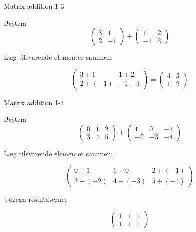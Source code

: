 \documentclass{article}
\begin{document}
\newpage

\begin{exercise}{Matrix addition 1-3}

Bestem
\[
\begin{pmatrix} 3 & 1 \\ 2 & -1 \end{pmatrix} + \begin{pmatrix} 1 & 2 \\ -1 & 3 \end{pmatrix}
\]


\hint

Læg tilsvarende elementer sammen:

\hint
\[
\begin{pmatrix} 3 + 1 & 1 + 2 \\ 2 + (-1) & -1 + 3 \end{pmatrix} = \begin{pmatrix} 4 & 3 \\ 1 & 2 \end{pmatrix}
\]

\end{exercise}

\newpage

\begin{exercise}{Matrix addition 1-4}

Bestem
\[
\begin{pmatrix} 0 & 1 & 2 \\ 3 & 4 & 5 \end{pmatrix} + \begin{pmatrix} 1 & 0 & -1 \\ -2 & -3 & -4 \end{pmatrix}
\]


\hint

Læg tilsvarende elementer sammen:

\hint
\[
\begin{pmatrix} 0 + 1 & 1 + 0 & 2 + (-1) \\ 3 + (-2) & 4 + (-3) & 5 + (-4) \end{pmatrix}
\]

\hint

Udregn resultaterne:

\hint
\[
\begin{pmatrix} 1 & 1 & 1 \\ 1 & 1 & 1 \end{pmatrix}
\]

\end{exercise}
\end{document}
